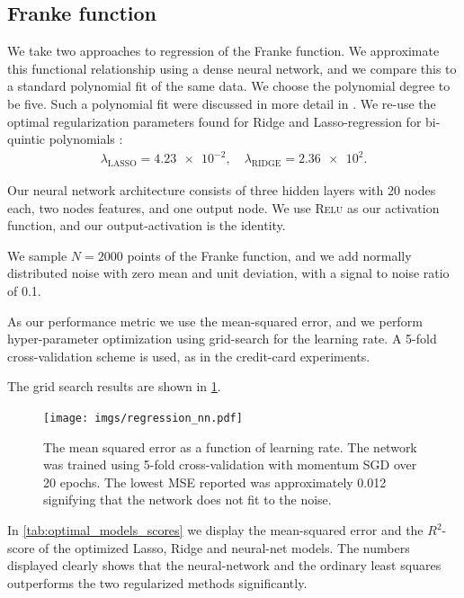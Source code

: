 \documentclass[a4paper, 11pt, oneside, article]{memoir}
\begin{document}
	\subsection{Franke function}
	
	We take two approaches to regression of the Franke function. We
	approximate this functional relationship using a dense neural network,
	and we compare this to a standard polynomial fit of the same data. We
	choose the polynomial degree to be five. Such a polynomial fit were
	discussed in more detail in
	\cite{stangebyFYSSTK4155Project2019}.
	We re-use the optimal regularization parameters found for Ridge and
	Lasso-regression for bi-quintic polynomials \cite[Section 4, p.
	16]{stangebyFYSSTK4155Project2019}:
	\begin{align}
		\label{eq:optimal_reg_params}
		\lambda_{\mathrm{LASSO}} = \num{4.23e-2}, \quad \lambda_{\mathrm{RIDGE}} = \num{2.36e2}.
	\end{align}

	Our neural network architecture consists of three hidden layers with 20
	nodes each, two nodes features, and one output node. We use
	\textsc{Relu} as our activation function, and our output-activation is
	the identity.

	We sample \( N = 2000 \) points of the Franke function, and we add
	normally distributed noise with zero mean and unit deviation, with a
	signal to noise ratio of 0.1.

	As our performance metric we use the mean-squared error, and we perform
	hyper-parameter optimization using grid-search for the learning rate. A
	5-fold cross-validation scheme is used, as in the credit-card
	experiments.
	
	The grid search results are shown in \cref{fig:regression_nn_cv}.
	\begin{figure}[htpb]
		\centering
		\texttt{[image: imgs/regression\_nn.pdf]}
		\caption{The mean squared error as a function of learning rate.
		The network was trained using 5-fold cross-validation with
	momentum SGD over 20 epochs. The lowest MSE reported was approximately
0.012 signifying that the network does not fit to the noise.}%
	\label{fig:regression_nn_cv}
	\end{figure}
	
	In \cref{tab:optimal_models_scores} we display the mean-squared error
	and the \(R^2\)-score of the optimized Lasso, Ridge and neural-net
	models. The numbers displayed clearly shows that the neural-network and
	the ordinary least squares outperforms the two regularized methods
	significantly.
\end{document}
